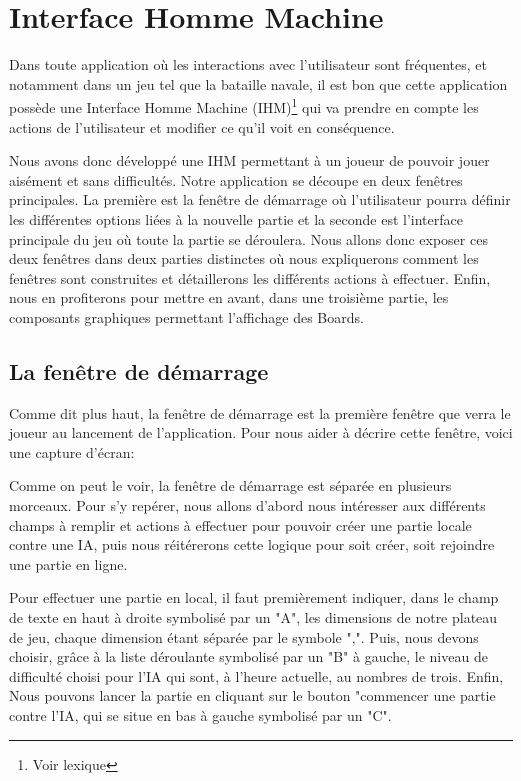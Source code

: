 \section{Interface Homme Machine}
	Dans toute application où les interactions avec l'utilisateur sont fréquentes, et notamment dans un jeu tel que la bataille navale, il est bon que cette application possède une Interface Homme Machine (IHM)\footnote{Voir lexique} qui va prendre en compte les actions de l'utilisateur et modifier ce qu'il voit en conséquence. \newline
	
	Nous avons donc développé une IHM permettant à un joueur de pouvoir jouer aisément et sans difficultés. Notre application se découpe en deux fenêtres principales. La première est la fenêtre de démarrage où l'utilisateur pourra définir les différentes options liées à la nouvelle partie et la seconde est l'interface principale du jeu où toute la partie se déroulera. Nous allons donc exposer ces deux fenêtres dans deux parties distinctes où nous expliquerons comment les fenêtres sont construites et détaillerons les différents actions à effectuer. Enfin, nous en profiterons pour mettre en avant, dans une troisième partie, les composants graphiques permettant l'affichage des Boards.
	
\subsection{La fenêtre de démarrage}
	Comme dit plus haut, la fenêtre de démarrage est la première fenêtre que verra le joueur au lancement de l'application. Pour nous aider à décrire cette fenêtre, voici une capture d'écran:

	
	Comme on peut le voir, la fenêtre de démarrage est séparée en plusieurs morceaux. Pour s'y repérer, nous allons d'abord nous intéresser aux différents champs à remplir et actions à effectuer pour pouvoir créer une partie locale contre une IA, puis nous réitérerons cette logique pour soit créer, soit rejoindre une partie en ligne.
	
		Pour effectuer une partie en local, il faut premièrement indiquer, dans le champ de texte en haut à droite symbolisé par un "A", les dimensions de notre plateau de jeu, chaque dimension étant séparée par le symbole ",". Puis, nous devons choisir, grâce à la liste déroulante symbolisé par un "B" à gauche, le niveau de difficulté choisi pour l'IA qui sont, à l'heure actuelle, au nombres de trois. Enfin, Nous pouvons lancer la partie en cliquant sur le bouton "commencer une partie contre l'IA, qui se situe en bas à gauche symbolisé par un "C".

